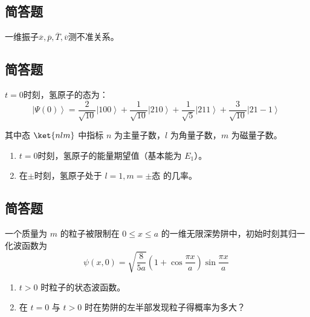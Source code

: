 \subsection{简答题}
一维振子$\overline{x},\overline{p},\overline{T},\overline{v}$测不准关系。
\subsection{简答题}
$t=0$时刻，氢原子的态为：
\[
\left| \Psi(0) \right\rangle = \frac{2}{\sqrt{10}} \left| 100 \right\rangle + \frac{1}{\sqrt{10}} \left| 210 \right\rangle + \frac{1}{\sqrt{5}} \left| 211 \right\rangle + \frac{3}{\sqrt{10}} \left| 21-1 \right\rangle~
\]

其中态 $\ket{nlm}$ 中指标 $n$ 为主量子数，$l$ 为角量子数，$m$ 为磁量子数。

\begin{enumerate}
    \item $t=0$时刻，氢原子的能量期望值（基本能为 $E_1$）。
    \item 在$\pm$时刻，氢原子处于 $l=1, m=\pm$态 的几率。
\end{enumerate}
\subsection{简答题}
一个质量为 $m$ 的粒子被限制在 $0 \leq x \leq a$ 的一维无限深势阱中，初始时刻其归一化波函数为 
\[
\psi(x,0) = \sqrt{\frac{8}{5a}} \left( 1 + \cos \frac{\pi x}{a} \right) \sin \frac{\pi x}{a}~
\]

\begin{enumerate}
    \item  $t > 0$ 时粒子的状态波函数。
    \item  在 $t = 0$ 与 $t > 0$ 时在势阱的左半部发现粒子得概率为多大？
\end{enumerate}